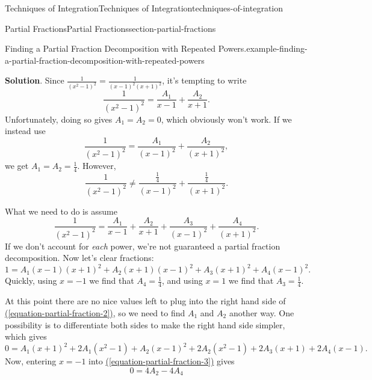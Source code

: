 \documentclass[oneside,10pt,]{book}
\numberwithin{equation}{section}
\begin{document}
\begin{chapterptx}{Techniques of Integration}{}{Techniques of Integration}{}{}{techniques-of-integration}
\begin{sectionptx}{Partial Fractions}{}{Partial Fractions}{}{}{section-partial-fractions}
\begin{example}{Finding a Partial Fraction Decomposition with Repeated Powers.}{example-finding-a-partial-fraction-decomposition-with-repeated-powers}
\par\smallskip%
\noindent\textbf{Solution}.\hypertarget{solution-122}{}\quad%
\hypertarget{p-556}{}%
Since \(\frac{1}{(x^{2} - 1)^{2}} = \frac{1}{(x-1)^{2}(x+1)^{2}}\), it's tempting to write%
\begin{equation*}
\frac{1}{(x^{2}-1)^{2}} = \frac{A_{1}}{x-1} + \frac{A_{2}}{x+1}.
\end{equation*}
Unfortunately, doing so gives \(A_{1} = A_{2} = 0\), which obviously won't work. If we instead use%
\begin{equation*}
\frac{1}{(x^{2}-1)^{2}} = \frac{A_{1}}{(x-1)^{2}} + \frac{A_{2}}{(x+1)^{2}},
\end{equation*}
we get \(A_{1} = A_{2} = \frac{1}{4}\). However,%
\begin{equation*}
\frac{1}{(x^{2}-1)^{2}} \neq \frac{\frac{1}{4}}{(x-1)^{2}} + \frac{\frac{1}{4}}{(x+1)^{2}}.
\end{equation*}
%
\par
\hypertarget{p-557}{}%
What we need to do is assume%
\begin{equation*}
\frac{1}{(x^{2}-1)^{2}} = \frac{A_{1}}{x-1} + \frac{A_{2}}{x+1} + \frac{A_{3}}{(x-1)^{2}} + \frac{A_{4}}{(x+1)^{2}}.
\end{equation*}
If we don't account for \emph{each} power, we're not guaranteed a partial fraction decomposition. Now let's clear fractions:%
\begin{equation}
1 = A_{1}(x-1)(x+1)^{2} + A_{2}(x+1)(x-1)^{2} + A_{3}(x+1)^{2} + A_{4}(x-1)^{2}.\label{equation-partial-fraction-2}
\end{equation}
Quickly, using \(x=-1\) we find that \(A_{4} = \frac{1}{4}\), and using \(x = 1\) we find that \(A_{3} = \frac{1}{4}\).%
\par
\hypertarget{p-558}{}%
At this point there are no nice values left to plug into the right hand side of \hyperref[equation-partial-fraction-2]{(\ref{equation-partial-fraction-2})}, so we need to find \(A_{1}\) and \(A_{2}\) another way. One possibility is to differentiate both sides to make the right hand side simpler, which gives%
\begin{equation}
0 = A_{1}(x+1)^{2} + 2A_{1}(x^{2}-1) + A_{2}(x-1)^{2} + 2A_{2}(x^{2} - 1) + 2A_{3}(x+1) + 2A_{4}(x-1).\label{equation-partial-fraction-3}
\end{equation}
Now, entering \(x = -1\) into \hyperref[equation-partial-fraction-3]{(\ref{equation-partial-fraction-3})} gives%
\begin{equation*}
0 = 4A_{2} - 4A_{4}
\end{equation*}

\end{example}
\end{sectionptx}
\end{chapterptx}
\end{document}
